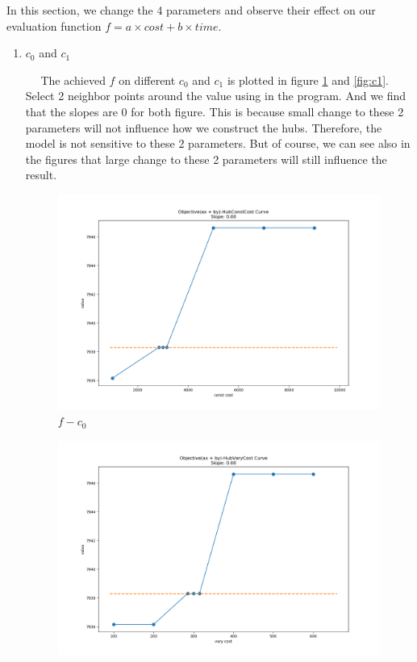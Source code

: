 \documentclass[11pt, a4paper]{article} %
\begin{document}
In this section, we change the 4 parameters and observe their effect on our evaluation function $f=a\times cost+b\times time$.
\begin{enumerate}
	\item $c_0$ and $c_1$\par
	$\quad$ The achieved $f$ on different $c_0$ and $c_1$ is plotted in figure \ref{fig:c0} and \ref{fig:c1}. Select 2 neighbor points around the value using in the program. And we find that the slopes are 0 for both figure. This is because small change to these 2 parameters will not influence how we construct the hubs. Therefore, the model is not sensitive to these 2 parameters. But of course, we can see also in the figures that large change to these 2 parameters will still influence the result. 
	\begin{figure}
		\centering
		\includegraphics[width=\textwidth]{figure/const_cost.png}
		\caption{$f-c_0$}
		\label{fig:c0}
	\end{figure}
	\begin{figure}
		\centering
		\includegraphics[width=\textwidth]{figure/vary_cost.png}

\end{figure}
\end{enumerate}
\end{document}
